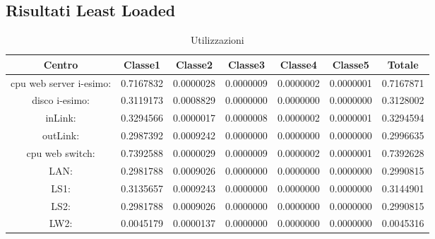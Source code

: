 \subsection{Risultati Least Loaded}
\begin{table}[H]
\begin{center}\begin{scriptsize}
\begin{tabular}{||c|c|c|c|c|c|c||}
\hline
Centro &Classe1 &Classe2 &Classe3 &Classe4 &Classe5 &Totale\\
\hline
\hline
 cpu web server i-esimo: 	&0.7167832	&0.0000028	&0.0000009	&0.0000002	&0.0000001	&0.7167871\\
\hline
 disco i-esimo: 	&0.3119173	&0.0008829	&0.0000000	&0.0000000	&0.0000000	&0.3128002\\
\hline
 inLink: 	&0.3294566	&0.0000017	&0.0000008	&0.0000002	&0.0000001	&0.3294594\\
\hline
 outLink: 	&0.2987392	&0.0009242	&0.0000000	&0.0000000	&0.0000000	&0.2996635\\
\hline
 cpu web switch: 	&0.7392588	&0.0000029	&0.0000009	&0.0000002	&0.0000001	&0.7392628\\
\hline
 LAN: 	&0.2981788	&0.0009026	&0.0000000	&0.0000000	&0.0000000	&0.2990815\\
\hline
 LS1: 	&0.3135657	&0.0009243	&0.0000000	&0.0000000	&0.0000000	&0.3144901\\
\hline
 LS2:	&0.2981788	&0.0009026	&0.0000000	&0.0000000	&0.0000000	&0.2990815\\
\hline
 LW2: 	&0.0045179	&0.0000137	&0.0000000	&0.0000000	&0.0000000	&0.0045316\\
\hline
\end{tabular}
\end{scriptsize}\end{center}
\caption{Utilizzazioni}
\label{utilizzazioni}
\end{table}


